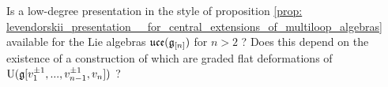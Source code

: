         \begin{question}
            Is a low-degree presentation in the style of proposition \ref{prop: levendorskii_presentation__for_central_extensions_of_multiloop_algebras} available for the Lie algebras $\mathfrak{uce}(\mathfrak{g}_{[n]})$ for $n > 2$ ? Does this depend on the existence of a construction of  which are graded flat deformations of $\mathrm{U}(\mathfrak{g}[v_1^{\pm 1}, ..., v_{n - 1}^{\pm 1}, v_n])$ ?
        \end{question}